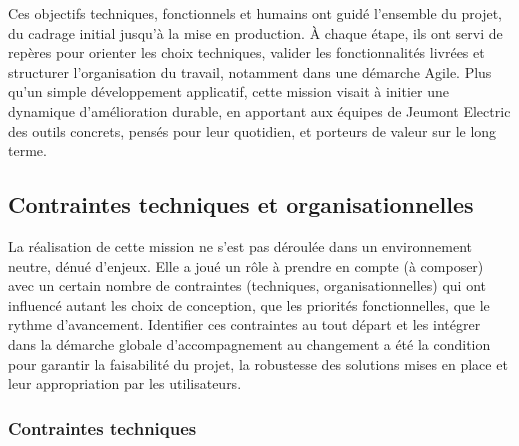 \documentclass[11pt,a4paper]{article}
\begin{document}
Ces objectifs techniques, fonctionnels et humains ont guidé l’ensemble du projet, du cadrage initial jusqu’à la mise en production. À chaque étape, ils ont servi de repères pour orienter les choix techniques, valider les fonctionnalités livrées et structurer l’organisation du travail, notamment dans une démarche Agile. Plus qu’un simple développement applicatif, cette mission visait à initier une dynamique d’amélioration durable, en apportant aux équipes de Jeumont Electric des outils concrets, pensés pour leur quotidien, et porteurs de valeur sur le long terme.

\subsection{Contraintes techniques et organisationnelles}

La réalisation de cette mission ne s’est pas déroulée dans un environnement neutre, dénué d’enjeux. Elle a joué un rôle à prendre en compte (à composer) avec un certain nombre de contraintes (techniques, organisationnelles) qui ont influencé autant les choix de conception, que les priorités fonctionnelles, que le rythme d’avancement. Identifier ces contraintes au tout départ et les intégrer dans la démarche globale d’accompagnement au changement a été la condition pour garantir la faisabilité du projet, la robustesse des solutions mises en place et leur appropriation par les utilisateurs.


\subsubsection{Contraintes techniques}
\end{document}
